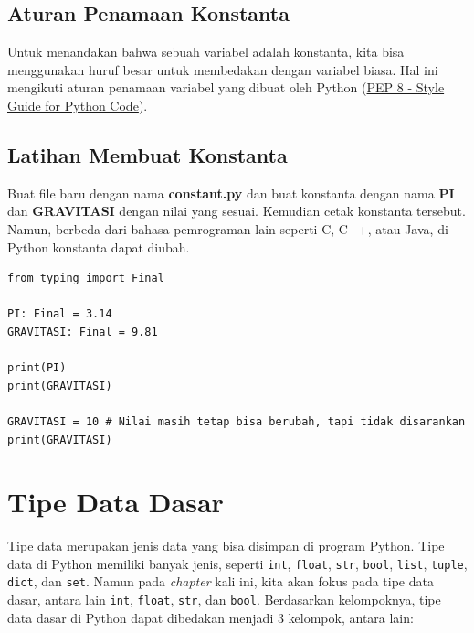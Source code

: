 \subsection{Aturan Penamaan Konstanta}

Untuk menandakan bahwa sebuah variabel adalah konstanta, kita bisa menggunakan huruf besar untuk membedakan dengan variabel biasa. Hal ini mengikuti aturan penamaan variabel yang dibuat oleh Python (\href{https://peps.python.org/pep-0008/}{PEP 8 - Style Guide for Python Code}).

\subsection{Latihan Membuat Konstanta}

Buat file baru dengan nama \textbf{constant.py} dan buat konstanta dengan nama \textbf{PI} dan \textbf{GRAVITASI} dengan nilai yang sesuai. Kemudian cetak konstanta tersebut. Namun, berbeda dari bahasa pemrograman lain seperti C, C++, atau Java, di Python konstanta dapat diubah.
\begin{lstlisting}[style=PythonStyle, caption={Kode Python: constant.py}]
from typing import Final

PI: Final = 3.14
GRAVITASI: Final = 9.81

print(PI)
print(GRAVITASI)

GRAVITASI = 10 # Nilai masih tetap bisa berubah, tapi tidak disarankan
print(GRAVITASI)
\end{lstlisting}

\section{Tipe Data Dasar}

Tipe data merupakan jenis data yang bisa disimpan di program Python. Tipe data di Python memiliki banyak jenis, seperti \texttt{int}, \texttt{float}, \texttt{str}, \texttt{bool}, \texttt{list}, \texttt{tuple}, \texttt{dict}, dan \texttt{set}. Namun pada \textit{chapter} kali ini, kita akan fokus pada tipe data dasar, antara lain \texttt{int}, \texttt{float}, \texttt{str}, dan \texttt{bool}.
\newline \newline
Berdasarkan kelompoknya, tipe data dasar di Python dapat dibedakan menjadi 3 kelompok, antara lain:

